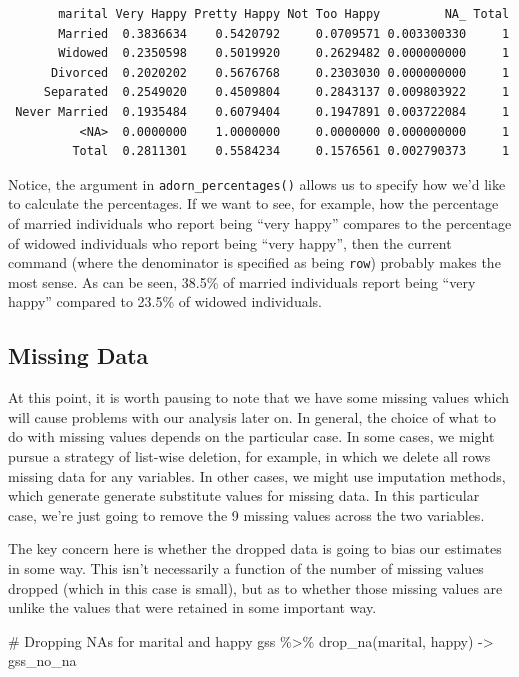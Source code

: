 \documentclass[
  letterpaper,
]{book}
\newenvironment{Shaded}{\begin{snugshade}}{\end{snugshade}}
\newcommand{\CommentTok}[1]{\textcolor[rgb]{0.37,0.37,0.37}{#1}}
\newcommand{\FunctionTok}[1]{\textcolor[rgb]{0.28,0.35,0.67}{#1}}
\newcommand{\NormalTok}[1]{\textcolor[rgb]{0.00,0.23,0.31}{#1}}
\newcommand{\OtherTok}[1]{\textcolor[rgb]{0.00,0.23,0.31}{#1}}
\newcommand{\SpecialCharTok}[1]{\textcolor[rgb]{0.37,0.37,0.37}{#1}}
\begin{document}
\begin{verbatim}
       marital Very Happy Pretty Happy Not Too Happy         NA_ Total
       Married  0.3836634    0.5420792     0.0709571 0.003300330     1
       Widowed  0.2350598    0.5019920     0.2629482 0.000000000     1
      Divorced  0.2020202    0.5676768     0.2303030 0.000000000     1
     Separated  0.2549020    0.4509804     0.2843137 0.009803922     1
 Never Married  0.1935484    0.6079404     0.1947891 0.003722084     1
          <NA>  0.0000000    1.0000000     0.0000000 0.000000000     1
         Total  0.2811301    0.5584234     0.1576561 0.002790373     1
\end{verbatim}

Notice, the argument in \texttt{adorn\_percentages()} allows us to
specify how we'd like to calculate the percentages. If we want to see,
for example, how the percentage of married individuals who report being
``very happy'' compares to the percentage of widowed individuals who
report being ``very happy'', then the current command (where the
denominator is specified as being \texttt{row}) probably makes the most
sense. As can be seen, 38.5\% of married individuals report being ``very
happy'' compared to 23.5\% of widowed individuals.

\hypertarget{missing-data}{%
\subsection{Missing Data}\label{missing-data}}

At this point, it is worth pausing to note that we have some missing
values which will cause problems with our analysis later on. In general,
the choice of what to do with missing values depends on the particular
case. In some cases, we might pursue a strategy of list-wise deletion,
for example, in which we delete all rows missing data for any variables.
In other cases, we might use imputation methods, which generate generate
substitute values for missing data. In this particular case, we're just
going to remove the 9 missing values across the two variables.

The key concern here is whether the dropped data is going to bias our
estimates in some way. This isn't necessarily a function of the number
of missing values dropped (which in this case is small), but as to
whether those missing values are unlike the values that were retained in
some important way.

\begin{Shaded}
\begin{Highlighting}[]
\CommentTok{\# Dropping NAs for marital and happy}
\NormalTok{gss }\SpecialCharTok{\%\textgreater{}\%}
  \FunctionTok{drop\_na}\NormalTok{(marital, happy) }\OtherTok{{-}\textgreater{}}\NormalTok{ gss\_no\_na}
\end{Highlighting}
\end{Shaded}
\end{document}
